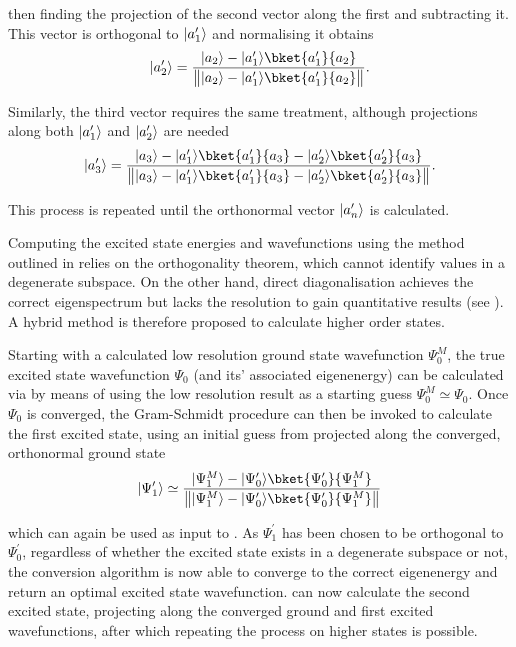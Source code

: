 then finding the projection of the second vector along the first and subtracting it.
This vector is orthogonal to $\lvert a^\prime_1\rangle$ and normalising it obtains
\begin{equation}
\ket{a^\prime_2} = \frac{\ket{a_2}-\ket{a^\prime_1}\bket{a^\prime_1}{a_2}}{\norm[\big]{\ket{a_2}-\ket{a^\prime_1}\bket{a^\prime_1}{a_2}}}.
\end{equation}

Similarly, the third vector requires the same treatment, although projections along both $\lvert a^\prime_1\rangle$ and $\lvert a^\prime_2\rangle$ are needed
\begin{equation}
\ket{a^\prime_3} = \frac{\ket{a_3}-\ket{a^\prime_1}\bket{a^\prime_1}{a_3}-\ket{a^\prime_2}\bket{a^\prime_2}{a_3}}{\norm[\big]{\ket{a_3}-\ket{a^\prime_1}\bket{a^\prime_1}{a_3}-\ket{a^\prime_2}\bket{a^\prime_2}{a_3}}}.\label{eq:gs3ex}
\end{equation}

This process is repeated until the orthonormal vector $\lvert a^\prime_n\rangle$ is calculated.

Computing the excited state energies and wavefunctions using the method outlined in  relies on the orthogonality theorem, which cannot identify values in a degenerate subspace.
On the other hand, direct diagonalisation achieves the correct eigenspectrum but lacks the resolution to gain quantitative results (see ).
A hybrid method is therefore proposed to calculate higher order states.

Starting with a  calculated low resolution ground state wavefunction $\Psi_0^{M}$, the true excited state wavefunction $\Psi_0$ (and its' associated eigenenergy) can be calculated via  by means of using the low resolution result as a starting guess $\Psi_0^{M} \simeq \Psi_0$.
Once $\Psi_0$ is converged, the Gram-Schmidt procedure can then be invoked to calculate the first excited state, using an initial guess from  projected along the converged, orthonormal ground state
\begin{equation}
    \ket{\Psi^\prime_1} \simeq \frac{\ket{\Psi^M_1} - \ket{\Psi^\prime_0}\bket{\Psi^\prime_0}{\Psi^M_1}}{\norm[\big]{\ket{\Psi^M_1} - \ket{\Psi^\prime_0}\bket{\Psi^\prime_0}{\Psi^M_1}}}
\end{equation}

which can again be used as input to .
As $\Psi^\prime_1$ has been chosen to be orthogonal to $\Psi^\prime_0$, regardless of whether the excited state exists in a degenerate subspace or not, the conversion algorithm is now able to converge to the correct eigenenergy and return an optimal excited state wavefunction.
 can now calculate the second excited state, projecting along the converged ground and first excited wavefunctions, after which repeating the process  on higher states is possible.

 